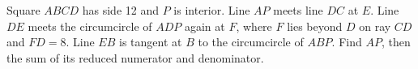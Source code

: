 Square $ABCD$ has side 12 and $P$ is interior. Line $AP$ meets line $DC$ at $E$. Line $DE$ meets the circumcircle of $ADP$ again at $F$, where $F$ lies beyond $D$ on ray $CD$ and $FD=8$. Line $EB$ is tangent at $B$ to the circumcircle of $ABP$. Find $AP$, then the sum of its reduced numerator and denominator.
